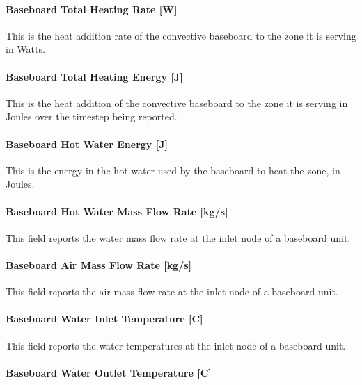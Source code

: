 \paragraph{Baseboard Total Heating Rate {[}W{]}}\label{baseboard-total-heating-rate-w-3}

This is the heat addition rate of the convective baseboard to the zone it is serving in Watts.

\paragraph{Baseboard Total Heating Energy {[}J{]}}\label{baseboard-total-heating-energy-j-3}

This is the heat addition of the convective baseboard to the zone it is serving in Joules over the timestep being reported.

\paragraph{Baseboard Hot Water Energy {[}J{]}}\label{baseboard-hot-water-energy-j}

This is the energy in the hot water used by the baseboard to heat the zone, in Joules.

\paragraph{Baseboard Hot Water Mass Flow Rate {[}kg/s{]}}\label{baseboard-hot-water-mass-flow-rate-kgs-1}

This field reports the water mass flow rate at the inlet node of a baseboard unit.

\paragraph{Baseboard Air Mass Flow Rate {[}kg/s{]}}\label{baseboard-air-mass-flow-rate-kgs-1}

This field reports the air mass flow rate at the inlet node of a baseboard unit.

\paragraph{Baseboard Water Inlet Temperature {[}C{]}}\label{baseboard-water-inlet-temperature-c-1}

This field reports the water temperatures at the inlet node of a baseboard unit.

\paragraph{Baseboard Water Outlet Temperature {[}C{]}}\label{baseboard-water-outlet-temperature-c-1}

